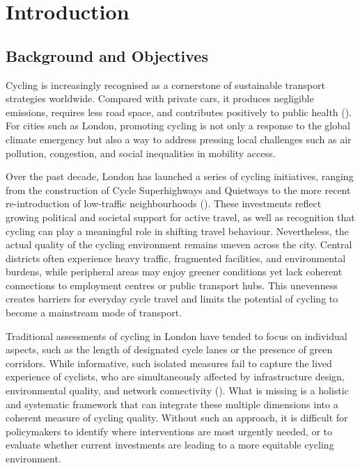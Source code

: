 \documentclass[
  12pt,
  oneside]{book}
\begin{document}
\chapter{Introduction}\label{introduction}


\section{Background and Objectives}\label{background-and-objectives}

Cycling is increasingly recognised as a cornerstone of sustainable transport strategies worldwide. Compared with private cars, it produces negligible emissions, requires less road space, and contributes positively to public health (\textcite{pucher_cycling_2017}). For cities such as London, promoting cycling is not only a response to the global climate emergency but also a way to address pressing local challenges such as air pollution, congestion, and social inequalities in mobility access.

Over the past decade, London has launched a series of cycling initiatives, ranging from the construction of Cycle Superhighways and Quietways to the more recent re-introduction of low-traffic neighbourhoods (\textcite{tfl_cycling_action_2018}). These investments reflect growing political and societal support for active travel, as well as recognition that cycling can play a meaningful role in shifting travel behaviour. Nevertheless, the actual quality of the cycling environment remains uneven across the city. Central districts often experience heavy traffic, fragmented facilities, and environmental burdens, while peripheral areas may enjoy greener conditions yet lack coherent connections to employment centres or public transport hubs. This unevenness creates barriers for everyday cycle travel and limits the potential of cycling to become a mainstream mode of transport.

Traditional assessments of cycling in London have tended to focus on individual aspects, such as the length of designated cycle lanes or the presence of green corridors. While informative, such isolated measures fail to capture the lived experience of cyclists, who are simultaneously affected by infrastructure design, environmental quality, and network connectivity (\textcite{giles-corti_city_2016}). What is missing is a holistic and systematic framework that can integrate these multiple dimensions into a coherent measure of cycling quality. Without such an approach, it is difficult for policymakers to identify where interventions are most urgently needed, or to evaluate whether current investments are leading to a more equitable cycling environment.
\end{document}
